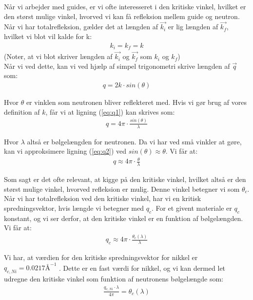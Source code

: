 \documentclass[12pt,oneside,a4paper]{article}
\begin{document}
{{{{{Når vi arbejder med guides, er vi ofte interesseret i den kritiske vinkel, hvilket er den størst mulige vinkel, hvorved vi kan få refleksion mellem guide og neutron. Når vi har totalrefleksion, gælder det at længden af $\vec{k_i}$ er lig længden af $\vec{k_f}$, hvilket vi blot vil kalde for k:
\begin{align}
k_i=k_f=k
\end{align}
(Noter, at vi blot skriver længden af $\vec{k_i}$ og $\vec{k_f}$ som $k_i$ og $k_f$) \\
Når vi ved dette, kan vi ved hjælp af simpel trigonometri skrive længden af $\vec{q}$ som:
\begin{align} \label{eq:q1}
q=2k \cdot sin(\theta)
\end{align}

Hvor $\theta$ er vinklen som neutronen bliver reflekteret med. Hvis vi gør brug af vores definition af $k$, får vi at ligning (\ref{eq:q1}) kan skrives som:
\begin{align} \label{eq:q2}
q=4\pi \cdot \frac{sin(\theta)}{\lambda}
\end{align}

Hvor $\lambda$ altså er bølgelængden for neutronen. Da vi har ved små vinkler at gøre, kan vi approksimere ligning (\ref{eq:q2})  ved $sin(\theta)≈\theta$. Vi får at:
\begin{align}
q≈4\pi \cdot \frac{\theta}{\lambda}
\end{align}

Som sagt er det ofte relevant, at kigge på den kritiske vinkel, hvilket altså er den størst mulige vinkel, hvorved refleksion er mulig. Denne vinkel betegner vi som $\theta_c$. Når vi har totalrefleksion ved den kritiske vinkel, har vi en kritisk spredningsvektor, hvis længde vi betegner med $q_c$. For et givent materiale er $q_c$ konstant, og vi ser derfor, at den kritiske vinkel er en funktion af bølgelængden. Vi får at:
\begin{align}
q_c≈4\pi \cdot \frac{\theta_c(\lambda)}{\lambda}
\end{align}

Vi har, at værdien for den kritiske spredningsvektor for nikkel er $q_{c, Ni}=0.0217\text{Å} ^{-1}$ \cite{lefmann_arleth_kirkensgaard_lebech_thomsen}. Dette er en fast værdi for nikkel, og vi kan dermed let udregne den kritiske vinkel som funktion af neutronens bølgelængde som: 
\begin{align}
\frac{q_{c,Ni} \cdot \lambda}{4\pi}=\theta_c(\lambda)
\end{align}

}}}}}
\end{document}
